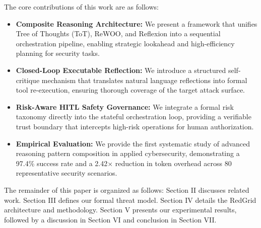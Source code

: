 The core contributions of this work are as follows:
\begin{itemize}
    \item \textbf{Composite Reasoning Architecture:} We present a framework that unifies Tree of Thoughts (ToT), ReWOO, and Reflexion into a sequential orchestration pipeline, enabling strategic lookahead and high-efficiency planning for security tasks.
    \item \textbf{Closed-Loop Executable Reflection:} We introduce a structured self-critique mechanism that translates natural language reflections into formal tool re-execution, ensuring thorough coverage of the target attack surface.
    \item \textbf{Risk-Aware HITL Safety Governance:} We integrate a formal risk taxonomy directly into the stateful orchestration loop, providing a verifiable trust boundary that intercepts high-risk operations for human authorization.
    \item \textbf{Empirical Evaluation:} We provide the first systematic study of advanced reasoning pattern composition in applied cybersecurity, demonstrating a 97.4\% success rate and a 2.42$\times$ reduction in token overhead across 80 representative security scenarios.
\end{itemize}

The remainder of this paper is organized as follows: Section II discusses related work. Section III defines our formal threat model. Section IV details the RedGrid architecture and methodology. Section V presents our experimental results, followed by a discussion in Section VI and conclusion in Section VII.
